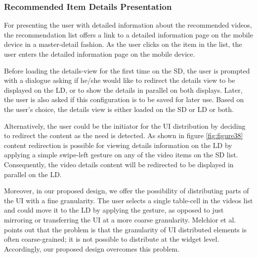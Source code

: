 \subsubsection{Recommended Item Details Presentation}
For presenting the user with detailed information about the recommended videos, the recommendation list offers a link to a detailed information page on the mobile device in a master-detail fashion. As the user clicks on the item in the list, the user enters the detailed information page on the mobile device.\par
Before loading the details-view for the first time on the SD, the user is prompted with a dialogue asking if he/she would like to redirect the details view to be displayed on the LD, or to show the details in parallel on both displays. Later, the user is also asked if this configuration is to be saved for later use. Based on the user's choice, the details view is either loaded on the SD or LD or both.\par
Alternatively, the user could be the initiator for the UI distribution by
deciding to redirect the content as the need is detected. As shown in figure
\ref{fig:figure38} content redirection is possible for viewing details
information on the LD by applying a simple swipe-left gesture on any of the
video items on the SD list. Consequently, the video details content will be redirected to be displayed in parallel on the LD.\par Moreover, in our proposed design, we offer the possibility of distributing parts of the UI with a fine granularity. The user selects a single table-cell in the
videos list and could move it to the LD by applying the gesture, as opposed to
just mirroring or transferring the UI at a more coarse granularity.
Melchior et al. \cite{melchior2011distribution} points out that the problem is
that the granularity of UI distributed elements is often coarse-grained; it is
not possible to distribute at the widget level. Accordingly, our proposed design 
overcomes this problem.
